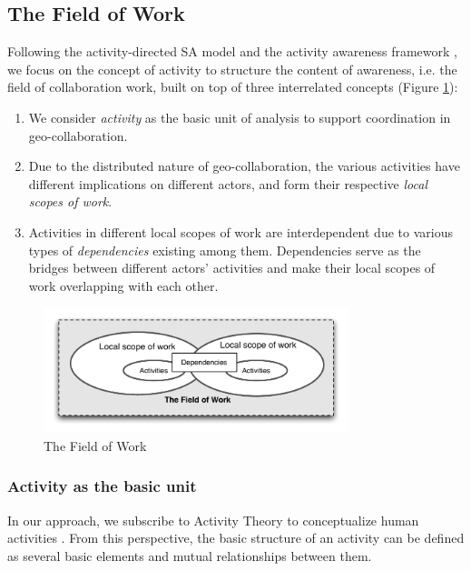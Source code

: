\subsection{The Field of Work} %
\label{sub:the_field_of_work}
Following the activity-directed SA model \cite{Bedny1999} and the activity awareness framework \cite{carroll2003a}, we focus on the concept of activity to structure the content of awareness, i.e. the field of collaboration work, built on top of three interrelated concepts (Figure \ref{fig:field_of_work}):

\begin{enumerate}
	\item We consider \emph{activity} as the basic unit of analysis to support coordination in geo-collaboration.
	\item Due to the distributed nature of geo-collaboration, the various activities have different implications on different actors, and form their respective \emph{local scopes of work}.
	\item Activities in different local scopes of work are interdependent due to various types of \emph{dependencies} existing among them. Dependencies serve as the bridges between different actors' activities and make their local scopes of work overlapping with each other. 
\end{enumerate}

\begin{figure}[htbp] %
   \centering
   \includegraphics[width=3.5in]{field_of_work.pdf} 
   \caption{The Field of Work}
   \label{fig:field_of_work}
\end{figure}

\subsubsection{Activity as the basic unit} %
\label{ssub:activity_basic_unit}
In our approach, we subscribe to Activity Theory to conceptualize human activities \cite{nardi1996context}. From this perspective, the basic structure of an activity can be defined as several basic elements and mutual relationships between them.

